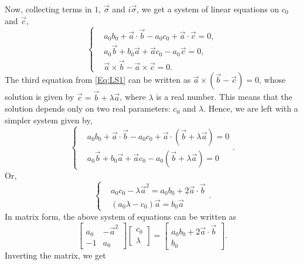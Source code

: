 Now, collecting terms in $1$, $\vec{\sigma}$ and $i\vec{\sigma}$, we get a system of linear equations on $c_0$ and $\vec{c}$,
\begin{equation}
\label{Eq:LS1}
\begin{cases}
& a_0 b_0+\vec{a}\cdot\vec{b}- a_0 c_0 +\vec{a}\cdot\vec{c}=0,\\
& a_0\vec{b}+b_0\vec{a}+\vec{a}c_0-a_0\vec{c}=0,\\
& \vec{a}\times \vec{b}-\vec{a}\times \vec{c}=0.
\end{cases}
\end{equation}
The third equation from \eqref{Eq:LS1} can be written as $\vec{a}\times(\vec{b}-\vec{c})=0$, whose solution is given by $\vec{c}=\vec{b}+\lambda\vec{a}$, where $\lambda$ is a real number. This means that the solution depends only on two real parameters: $c_0$ and $\lambda$. Hence, we are left with a simpler system given by,
\begin{equation}
\begin{cases}
& a_0 b_0+\vec{a}\cdot\vec{b}- a_0 c_0 +\vec{a}\cdot(\vec{b}+\lambda\vec{a})=0\\
& a_0\vec{b}+b_0\vec{a}+\vec{a}c_0-a_0(\vec{b}+\lambda \vec{a})=0
\end{cases}.
\end{equation}
Or,
\begin{equation}
\begin{cases}
& a_0 c_0 -\lambda\vec{a}^2=a_0 b_0+2\vec{a}\cdot\vec{b}\\
& (a_0\lambda-c_0)\vec{a}=b_0\vec{a}
\end{cases}.
\end{equation}
In matrix form, the above system of equations can be written as
\begin{equation}
\left[\begin{array}{cc}
a_0 & -\vec{a}^2\\
-1 & a_0	
\end{array}\right]\left[\begin{array}{c}
c_0\\
\lambda	
\end{array}
\right]=\left[\begin{array}{c}
a_0 b_0+2\vec{a}\cdot\vec{b}\\
b_0
\end{array}
\right].
\end{equation}
Inverting the matrix, we get
